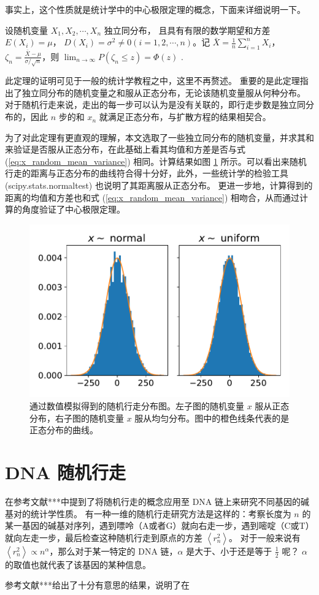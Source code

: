 \documentclass[
reprint,
amsmath,
amssymb,
aps,
prl
]{revtex4-1}
\begin{document}
 事实上，这个性质就是统计学中的中心极限定理的概念，下面来详细说明一下。
 
{\kaishu 设随机变量 $ X_{1},X_{2},\cdots ,X_{n}$ 独立同分布， 且具有有限的数学期望和方差 $E(X_{i})=\mu$， $D(X_{i})=\sigma ^{2}\neq 0(i=1,2,\cdots ,n)$。记 ${\bar {X}={ \frac {1}{n}}\sum _{i=1}^{n}X_{i}}$， $\zeta _{n}={\frac {{\bar {X}}-\mu }{\sigma /{\sqrt {n}}}}$，则 ${ \lim _{n\rightarrow \infty }P\left(\zeta _{n}\leq z\right)=\Phi \left(z\right)}$ .} 

此定理的证明可见于一般的统计学教程之中，这里不再赘述。
重要的是此定理指出了独立同分布的随机变量之和服从正态分布，无论该随机变量服从何种分布。
对于随机行走来说，走出的每一步可以认为是没有关联的，即行走步数是独立同分布的，因此 $n$ 步的和 $x_n$ 就满足正态分布，与扩散方程的结果相契合。

为了对此定理有更直观的理解，本文选取了一些独立同分布的随机变量，并求其和来验证是否服从正态分布，在此基础上看其均值和方差是否与式 (\ref{eq:x_random_mean_variance}) 相同。计算结果如图 \ref{fig:center_thm} 所示。可以看出来随机行走的距离与正态分布的曲线符合得十分好，此外，一些统计学的检验工具 (scipy.stats.normaltest) 也说明了其距离服从正态分布。
更进一步地，计算得到的距离的均值和方差也和式 (\ref{eq:x_random_mean_variance}) 相吻合，从而通过计算的角度验证了中心极限定理。

\begin{figure}
	\centering
	\includegraphics[width=\columnwidth]{center_thm.pdf}
	\caption{\label{fig:center_thm}通过数值模拟得到的随机行走分布图。左子图的随机变量 $x$ 服从正态分布，右子图的随机变量 $x$ 服从均匀分布。图中的橙色线条代表的是正态分布的曲线。}
\end{figure}

\section{DNA 随机行走}
在参考文献***中提到了将随机行走的概念应用至 DNA 链上来研究不同基因的碱基对的统计学性质。
有一种一维的随机行走研究方法是这样的：考察长度为 $n$ 的某一基因的碱基对序列，遇到嘌呤（A或者G）就向右走一步，遇到嘧啶（C或T）就向左走一步，最后检查这种随机行走到原点的方差 $\left\langle r_{n}^{2}\right\rangle$。
对于一般来说有 $\left\langle r_{n}^{2}\right\rangle \propto n^{\alpha}$，那么对于某一特定的 DNA 链，$\alpha$ 是大于、小于还是等于 $\frac{1}{2}$ 呢？
$\alpha$ 的取值也就代表了该基因的某种信息。

参考文献***给出了十分有意思的结果，说明了在
 
\end{document}
